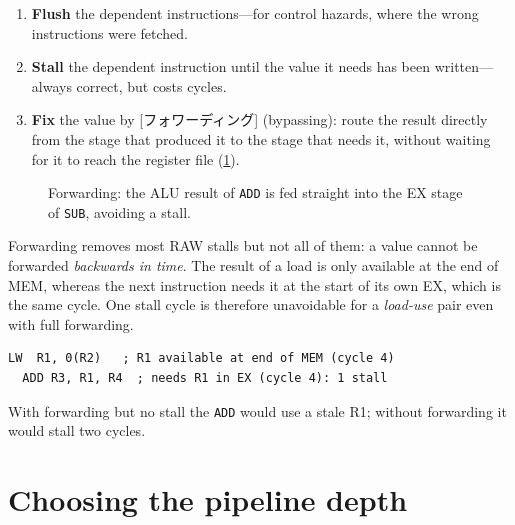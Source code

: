\documentclass[../main.tex]{subfiles}
\begin{document}
\begin{enumerate}
  \item \textbf{Flush} the dependent instructions---for control hazards,
    where the wrong instructions were fetched.
  \item \textbf{Stall} the dependent instruction until the value it needs
    has been written---always correct, but costs cycles.
  \item \textbf{Fix} the value by [フォワーディング]
    (bypassing): route the result directly from the stage that produced it
    to the stage that needs it, without waiting for it to reach the
    register file (\cref{fig:forwarding}).
\end{enumerate}

\begin{figure}[htbp]
  \centering
  
  \caption{Forwarding: the ALU result of \texttt{ADD} is fed straight into
    the EX stage of \texttt{SUB}, avoiding a stall.}
  \label{fig:forwarding}
\end{figure}

Forwarding removes most RAW stalls but not all of them: a value cannot be
forwarded \emph{backwards in time}.  The result of a load is only available
at the end of MEM, whereas the next instruction needs it at the start of
its own EX, which is the same cycle.  One stall cycle is therefore
unavoidable for a \emph{load-use} pair even with full forwarding.

\begin{example}\leavevmode %
  \begin{lstlisting}[language={[x86masm]Assembler}, numbers=none]
  LW  R1, 0(R2)   ; R1 available at end of MEM (cycle 4)
  ADD R3, R1, R4  ; needs R1 in EX (cycle 4): 1 stall
\end{lstlisting}
  With forwarding but no stall the \texttt{ADD} would use a stale R1;
  without forwarding it would stall two cycles.
\end{example}

\section{Choosing the pipeline depth}
\end{document}
